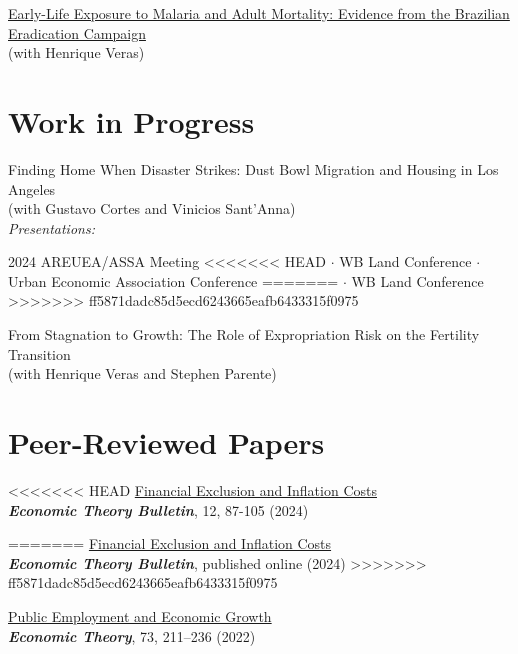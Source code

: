 \documentclass[mm, 10pt]{simple_style}
\begin{document}
\begin{resume}
\href{https://drive.google.com/file/d/1dIZK5thBKYu-IsduU5E65SdG_z4sQW8h/view}{Early-Life Exposure to Malaria and Adult Mortality: Evidence from the Brazilian Eradication Campaign}\\
(with Henrique Veras)

\section{Work in Progress}

Finding Home When Disaster Strikes: Dust Bowl Migration and Housing in Los Angeles \\
(with Gustavo Cortes and Vinicios Sant'Anna) \\
\textit{Presentations:} 
\begin{minipage}[t]{0.7\textwidth}
2024 AREUEA/ASSA Meeting
<<<<<<< HEAD
$\cdot$ {WB Land Conference}
$\cdot$ {\color{gray} Urban Economic Association Conference}
=======
$\cdot$ {\color{gray} WB Land Conference}
>>>>>>> ff5871dadc85d5ecd6243665eafb6433315f0975
\end{minipage}

From Stagnation to Growth: The Role of Expropriation Risk on the Fertility Transition\\
(with Henrique Veras and Stephen Parente)



\section{Peer-Reviewed Papers}
<<<<<<< HEAD
\href{https://doi.org/10.1007/s40505-024-00265-x}{Financial Exclusion and Inflation Costs}\\
\textbf{\textit{Economic Theory Bulletin}}, 12, 87-105 (2024) 

=======
\href{https://link.springer.com/article/10.1007/s40505-024-00265-x}{Financial Exclusion and Inflation Costs}\\
\textbf{\textit{Economic Theory Bulletin}}, published online (2024)
>>>>>>> ff5871dadc85d5ecd6243665eafb6433315f0975


\href{https://doi.org/10.1007/s00199-020-01333-6}{Public Employment and Economic Growth}\\
\textbf{\textit{Economic Theory}}, 73, 211–236 (2022)  


\end{resume}
\end{document}
